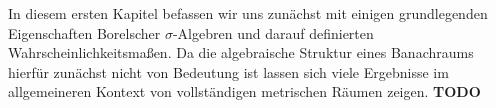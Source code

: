 In diesem ersten Kapitel befassen wir uns zunächst mit einigen grundlegenden Eigenschaften Borelscher $\sigma$-Algebren und darauf definierten Wahrscheinlichkeitsmaßen.
Da die algebraische Struktur eines Banachraums hierfür zunächst nicht von Bedeutung ist lassen sich viele Ergebnisse im allgemeineren Kontext von vollständigen metrischen Räumen zeigen. 
\textbf{TODO}